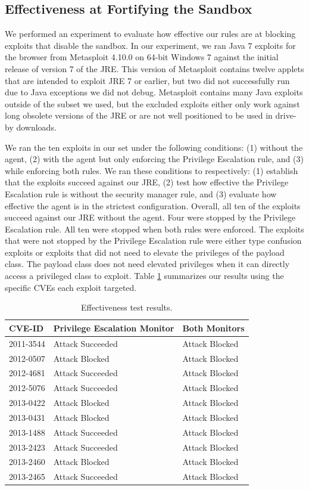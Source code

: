 \documentclass{sig-alternate}
\begin{document}
\subsection{Effectiveness at Fortifying the Sandbox}\label{sub:Effectiveness-at-Fortifying}


We performed an experiment to evaluate how effective our rules are
at blocking exploits that disable the sandbox. In our experiment,
we ran Java 7 exploits for the browser from Metasploit 4.10.0 on 64-bit
Windows 7 against the initial release of version 7 of the JRE. This
version of Metasploit contains twelve applets that are intended to
exploit JRE 7 or earlier, but two did not successfully run due to
Java exceptions we did not debug. Metasploit contains many Java exploits
outside of the subset we used, but the excluded exploits either only
work against long obsolete versions of the JRE or are not well positioned
to be used in drive-by downloads. 

We ran the ten exploits in our set under the following conditions:
(1) without the agent, (2) with the agent but only enforcing the Privilege
Escalation rule, and (3) while enforcing both rules. We ran these
conditions to respectively: (1) establish that the exploits succeed
against our JRE, (2) test how effective the Privilege Escalation rule
is without the security manager rule, and (3) evaluate how effective
the agent is in the strictest configuration. Overall, all
ten of the exploits succeed against our JRE without the agent. Four
were stopped by the Privilege Escalation rule. All ten were stopped
when both rules were enforced. The exploits that were not stopped
by the Privilege Escalation rule were either type confusion exploits
or exploits that did not need to elevate the privileges of the payload
class. The payload class does not need elevated privileges when it
can directly access a privileged class to exploit. Table \ref{tab:Exploit-experiment-summary}
summarizes our results using the specific CVEs each exploit targeted.

\begin{table}
\protect\caption{Effectiveness test results.}\label{tab:Exploit-experiment-summary}


\centering{}%
\begin{tabular}{l>{\raggedright}p{3cm}l}
\toprule 
\textbf{CVE-ID} & \textbf{Privilege Escalation Monitor} & \textbf{Both Monitors}\tabularnewline
\midrule
2011-3544 & Attack Succeeded  & Attack Blocked\tabularnewline
2012-0507 & Attack Blocked & Attack Blocked\tabularnewline
2012-4681 & Attack Succeeded  & Attack Blocked\tabularnewline
2012-5076 & Attack Succeeded  & Attack Blocked\tabularnewline
2013-0422 & Attack Blocked & Attack Blocked\tabularnewline
2013-0431 & Attack Blocked & Attack Blocked\tabularnewline
2013-1488 & Attack Succeeded  & Attack Blocked\tabularnewline
2013-2423 & Attack Succeeded  & Attack Blocked\tabularnewline
2013-2460 & Attack Blocked & Attack Blocked\tabularnewline
2013-2465 & Attack Succeeded  & Attack Blocked\tabularnewline
\bottomrule
\end{tabular}
\end{table}
\end{document}
